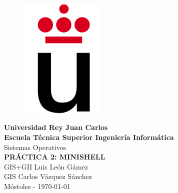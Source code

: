 \setlength{\unitlength}{1 cm} %
\thispagestyle{empty}
\begin{figure}[htb]
\begin{center}
\includegraphics[width=4cm]{./logoURJC}
\end{center}
\end{figure}
\begin{center}
\textbf{{\Huge Universidad Rey Juan Carlos}\\[0.5cm]
{\LARGE Escuela Técnica Superior Ingeniería Informática}}\\[1.25cm]
{\Large Sistemas Operativos}\\[2.3cm]
{\LARGE \textbf{ PRÁCTICA 2: MINISHELL}}\\[3cm]
{\large GIS+GII Luis León Gámez}\\[1cm]
{\large GIS Carlos Vázquez Sánchez}\\[1cm]
Móstoles - \today
\end{center}